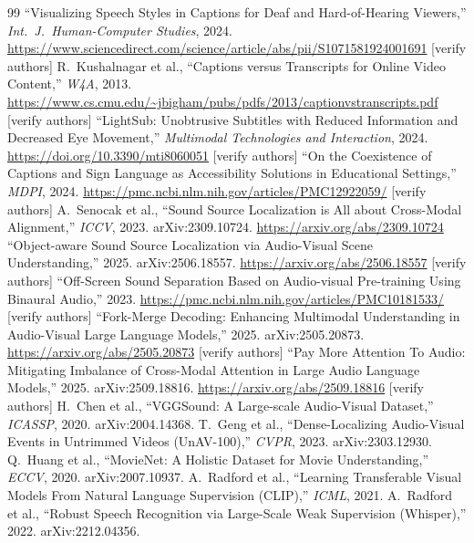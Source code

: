 \documentclass[11pt,a4paper]{article}
\begin{document}
\begin{thebibliography}{99}
 ``Visualizing Speech Styles in Captions for Deaf and Hard-of-Hearing Viewers,'' \emph{Int.\ J.\ Human-Computer Studies}, 2024. \url{https://www.sciencedirect.com/science/article/abs/pii/S1071581924001691} [verify authors]
 R.\ Kushalnagar et al., ``Captions versus Transcripts for Online Video Content,'' \emph{W4A}, 2013. \url{https://www.cs.cmu.edu/~jbigham/pubs/pdfs/2013/captionvstranscripts.pdf} [verify authors]
 ``LightSub: Unobtrusive Subtitles with Reduced Information and Decreased Eye Movement,'' \emph{Multimodal Technologies and Interaction}, 2024. \url{https://doi.org/10.3390/mti8060051} [verify authors]
 ``On the Coexistence of Captions and Sign Language as Accessibility Solutions in Educational Settings,'' \emph{MDPI}, 2024. \url{https://pmc.ncbi.nlm.nih.gov/articles/PMC12922059/} [verify authors]
 A.\ Senocak et al., ``Sound Source Localization is All about Cross-Modal Alignment,'' \emph{ICCV}, 2023. arXiv:2309.10724. \url{https://arxiv.org/abs/2309.10724}
 ``Object-aware Sound Source Localization via Audio-Visual Scene Understanding,'' 2025. arXiv:2506.18557. \url{https://arxiv.org/abs/2506.18557} [verify authors]
 ``Off-Screen Sound Separation Based on Audio-visual Pre-training Using Binaural Audio,'' 2023. \url{https://pmc.ncbi.nlm.nih.gov/articles/PMC10181533/} [verify authors]
 ``Fork-Merge Decoding: Enhancing Multimodal Understanding in Audio-Visual Large Language Models,'' 2025. arXiv:2505.20873. \url{https://arxiv.org/abs/2505.20873} [verify authors]
 ``Pay More Attention To Audio: Mitigating Imbalance of Cross-Modal Attention in Large Audio Language Models,'' 2025. arXiv:2509.18816. \url{https://arxiv.org/abs/2509.18816} [verify authors]
 H.\ Chen et al., ``VGGSound: A Large-scale Audio-Visual Dataset,'' \emph{ICASSP}, 2020. arXiv:2004.14368.
 T.\ Geng et al., ``Dense-Localizing Audio-Visual Events in Untrimmed Videos (UnAV-100),'' \emph{CVPR}, 2023. arXiv:2303.12930.
 Q.\ Huang et al., ``MovieNet: A Holistic Dataset for Movie Understanding,'' \emph{ECCV}, 2020. arXiv:2007.10937.
 A.\ Radford et al., ``Learning Transferable Visual Models From Natural Language Supervision (CLIP),'' \emph{ICML}, 2021.
 A.\ Radford et al., ``Robust Speech Recognition via Large-Scale Weak Supervision (Whisper),'' 2022. arXiv:2212.04356.
\end{thebibliography}
\end{document}
